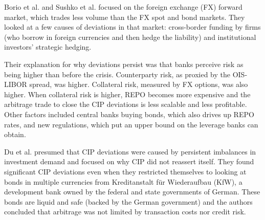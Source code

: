 Borio et al.\cite{Borio2016} and Sushko et al.\cite{Sushko2016} focused on the foreign exchange (FX) forward market, which trades less volume than the FX spot and bond markets.  They looked at a few causes of deviations in that market: cross-border funding by firms (who borrow in foreign currencies and then hedge the liability) and institutional investors' strategic hedging.  

Their explanation for why deviations persist was that banks perceive risk as being higher than before the crisis.  Counterparty risk, as proxied by the OIS-LIBOR spread, was higher.  Collateral risk, measured by FX options, was also higher.   When collateral risk is higher, REPO becomes more expensive and the arbitrage trade to close the CIP deviations is less scalable and less profitable.  Other factors included central banks buying bonds, which also drives up REPO rates, and new regulations, which put an upper bound on the leverage banks can obtain.  






 
Du et al.\cite{Du2017} presumed that CIP deviations were caused by persistent imbalances in investment demand and focused on why CIP did not reassert itself.  They found significant CIP deviations even when they restricted themselves to looking at bonds in multiple currencies from Kreditanstalt f\"ur Wiederaufbau (KfW), a development bank owned by the federal and state governments of German.  These bonds are liquid and safe (backed by the German government) and the authors concluded that arbitrage was not limited by transaction costs nor credit risk.

